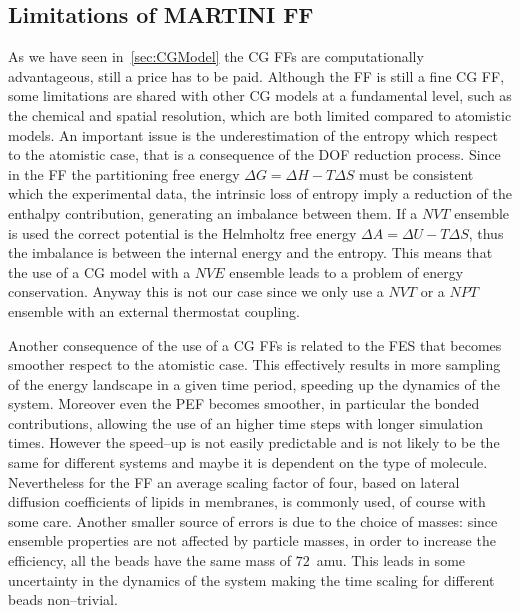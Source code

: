 \subsection{Limitations of MARTINI FF}
As we have seen in~\ref{sec:CGModel} the \ac{CG} \acp{FF} are computationally advantageous, still a price has to
be paid. Although the \martini{} \ac{FF} is still a fine \ac{CG} \ac{FF}, some limitations are shared with other
\ac{CG} models at a fundamental level, such as the chemical and spatial resolution, which are both limited
compared to atomistic models. An important issue is the underestimation of the entropy which respect to the
atomistic case, that is a consequence of the \ac{DOF} reduction process. Since in the \martini{} \ac{FF} the
partitioning free energy $\Delta G = \Delta H - T\Delta S$ must be consistent which the experimental data, the
intrinsic loss of entropy imply a reduction of the enthalpy contribution, generating an imbalance between them.
If a $NVT$ ensemble is used the correct potential is the Helmholtz free energy $\Delta A = \Delta U - T\Delta S$,
thus the imbalance is between the internal energy and the entropy. This means that the use of a \ac{CG} model
with a $NVE$ ensemble leads to a problem of energy conservation. Anyway this is not our case since we only use a
$NVT$ or a $NPT$ ensemble with an external thermostat coupling.

Another consequence of the use of a \ac{CG} \acp{FF} is related to the \ac{FES} that becomes smoother respect to
the atomistic case. This effectively results in more sampling of the energy landscape in a given time period,
speeding up the dynamics of the system. Moreover even the \ac{PEF} becomes smoother, in particular the bonded
contributions, allowing the use of an higher time steps with longer simulation times. However the speed--up is
not easily predictable and is not likely to be the same for different systems and maybe it is dependent on the
type of molecule. Nevertheless for the \martini{} \ac{FF} an average scaling factor of four, based on lateral
diffusion coefficients of lipids in membranes, is commonly used, of course with some care. Another smaller source
of errors is due to the choice of masses: since ensemble properties are not affected by particle masses, in order
to increase the efficiency, all the \martini{} beads have the same mass of $72$~amu. This leads in some uncertainty
in the dynamics of the system making the time scaling for different beads non--trivial.

